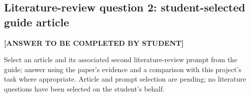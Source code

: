 \subsection{Literature-review question 2: student-selected guide article}
\textbf{[ANSWER TO BE COMPLETED BY STUDENT]}\par
Select an article and its associated second literature-review prompt from the guide; answer using the paper's evidence and a comparison with this project's task where appropriate. Article and prompt selection are pending; no literature questions have been selected on the student's behalf.
